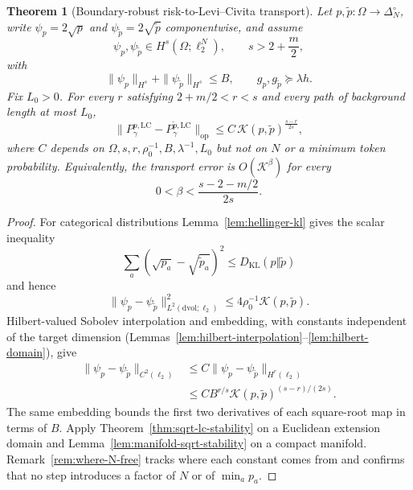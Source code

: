 \documentclass[11pt]{article}
\newtheorem{theorem}{Theorem}[section]
\theoremstyle{definition}
\theoremstyle{remark}
\newcommand{\simplex}{\Delta_{N}^{\circ}}
\newcommand{\KL}{D_{\mathrm{KL}}}
\newcommand{\LC}{\mathrm{LC}}
\newcommand{\op}{\mathrm{op}}
\newcommand{\dd}{\mathrm{d}}
\begin{document}
\begin{theorem}[Boundary-robust risk-to-Levi--Civita transport]\label{thm:sqrt-risk-to-transport}
Let $p,\widetilde p:\Omega\to\simplex$, write $\psi_p=2\sqrt p$ and $\psi_{\widetilde p}=2\sqrt{\widetilde p}$ componentwise, and assume
\begin{equation}
    \psi_p,\psi_{\widetilde p}\in H^s(\Omega;\ell_2^N),
    \qquad s>2+\frac m2,
\end{equation}
with
\begin{equation}
    \|\psi_p\|_{H^s}+\|\psi_{\widetilde p}\|_{H^s}\le B,
    \qquad g_p,g_{\widetilde p}\succeq\lambda h.
\end{equation}
Fix $L_0>0$. For every $r$ satisfying $2+m/2<r<s$ and every path of background length at most $L_0$,
\begin{equation}
    \|P_\gamma^{p,\LC}-P_\gamma^{\widetilde p,\LC}\|_{\op}
    \le C\,\mathcal K(p,\widetilde p)^{\frac{s-r}{2s}},
    \label{eq:sqrt-risk-transport}
\end{equation}
where $C$ depends on $\Omega,s,r,\rho_0^{-1},B,\lambda^{-1},L_0$ but not on $N$ or a minimum token probability. Equivalently, the transport error is $O(\mathcal K^\beta)$ for every
\begin{equation}
    0<\beta<\frac{s-2-m/2}{2s}.
\end{equation}
\end{theorem}

\begin{proof}
For categorical distributions Lemma~\ref{lem:hellinger-kl} gives the scalar inequality
\begin{equation}
    \sum_a(\sqrt{p_a}-\sqrt{\widetilde p_a})^2
    \le\KL(p\Vert\widetilde p)
\end{equation}
and hence
\begin{equation}
    \|\psi_p-\psi_{\widetilde p}\|_{L^2(\dd\mathrm{vol};\ell_2)}^2
    \le4\rho_0^{-1}\mathcal K(p,\widetilde p).
    \label{eq:sqrt-kl}
\end{equation}
Hilbert-valued Sobolev interpolation and embedding, with constants independent of the target dimension (Lemmas~\ref{lem:hilbert-interpolation}--\ref{lem:hilbert-domain}), give
\begin{equation}
\begin{split}
    \|\psi_p-\psi_{\widetilde p}\|_{C^2(\ell_2)}
    &\le C\|\psi_p-\psi_{\widetilde p}\|_{H^r(\ell_2)}\\
    &\le C B^{r/s}\mathcal K(p,\widetilde p)^{(s-r)/(2s)}.
\end{split}
\end{equation}
The same embedding bounds the first two derivatives of each square-root map in
terms of $B$. Apply Theorem~\ref{thm:sqrt-lc-stability} on a Euclidean extension
domain and Lemma~\ref{lem:manifold-sqrt-stability} on a compact manifold.
Remark~\ref{rem:where-N-free} tracks where each constant comes from and
confirms that no step introduces a factor of $N$ or of $\min_ap_a$.
\end{proof}
\end{document}

